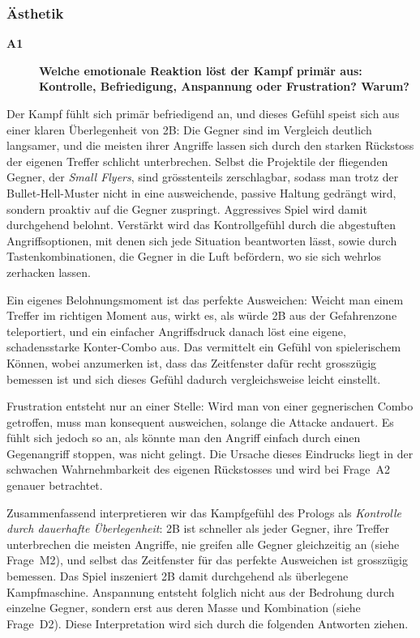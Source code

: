 \documentclass[../Main.tex]{subfiles}
\begin{document}
\subsubsection{Ästhetik}

\begin{description}
    \item[\textbf{A1}] \textbf{Welche emotionale Reaktion löst der Kampf primär aus: Kontrolle, Befriedigung, Anspannung oder Frustration? Warum?}
\end{description}

Der Kampf fühlt sich primär befriedigend an, und dieses Gefühl speist sich aus einer klaren Überlegenheit von 2B: Die Gegner sind im Vergleich deutlich langsamer, und die meisten ihrer Angriffe lassen sich durch den starken Rückstoss der eigenen Treffer schlicht unterbrechen. Selbst die Projektile der fliegenden Gegner, der \textit{Small Flyers}, sind grösstenteils zerschlagbar, sodass man trotz der Bullet-Hell-Muster nicht in eine ausweichende, passive Haltung gedrängt wird, sondern proaktiv auf die Gegner zuspringt. Aggressives Spiel wird damit durchgehend belohnt. Verstärkt wird das Kontrollgefühl durch die abgestuften Angriffsoptionen, mit denen sich jede Situation beantworten lässt, sowie durch Tastenkombinationen, die Gegner in die Luft befördern, wo sie sich wehrlos zerhacken lassen.

Ein eigenes Belohnungsmoment ist das perfekte Ausweichen: Weicht man einem Treffer im richtigen Moment aus, wirkt es, als würde 2B aus der Gefahrenzone teleportiert, und ein einfacher Angriffsdruck danach löst eine eigene, schadensstarke Konter-Combo aus. Das vermittelt ein Gefühl von spielerischem Können, wobei anzumerken ist, dass das Zeitfenster dafür recht grosszügig bemessen ist und sich dieses Gefühl dadurch vergleichsweise leicht einstellt.

Frustration entsteht nur an einer Stelle: Wird man von einer gegnerischen Combo getroffen, muss man konsequent ausweichen, solange die Attacke andauert. Es fühlt sich jedoch so an, als könnte man den Angriff einfach durch einen Gegenangriff stoppen, was nicht gelingt. Die Ursache dieses Eindrucks liegt in der schwachen Wahrnehmbarkeit des eigenen Rückstosses und wird bei Frage~A2 genauer betrachtet.

Zusammenfassend interpretieren wir das Kampfgefühl des Prologs als \textit{Kontrolle durch dauerhafte Überlegenheit}: 2B ist schneller als jeder Gegner, ihre Treffer unterbrechen die meisten Angriffe, nie greifen alle Gegner gleichzeitig an (siehe Frage~M2), und selbst das Zeitfenster für das perfekte Ausweichen ist grosszügig bemessen. Das Spiel inszeniert 2B damit durchgehend als überlegene Kampfmaschine. Anspannung entsteht folglich nicht aus der Bedrohung durch einzelne Gegner, sondern erst aus deren Masse und Kombination (siehe Frage~D2). Diese Interpretation wird sich durch die folgenden Antworten ziehen.
\end{document}
